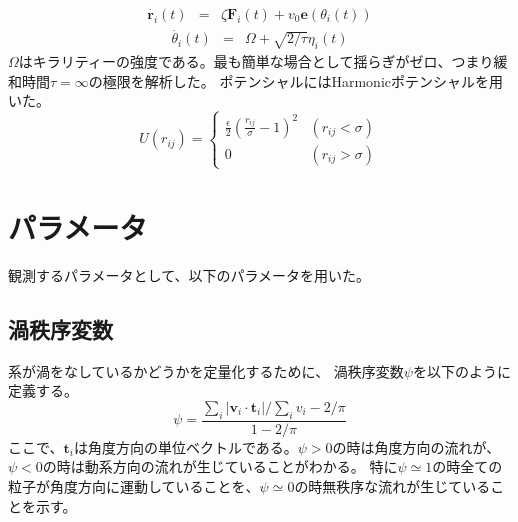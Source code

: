 \documentclass[/Users/ikedahajime/GitHub/reserch/master_report/thesis]{subfiles}
\begin{document}
\begin{eqnarray}
    \dot{\bm{r}_i}(t) &=& \zeta \bm{F}_i(t)+v_0 \bm{e}(\theta_i (t))
\end{eqnarray}
\begin{eqnarray}
    \dot{\theta_i }(t) &=& \Omega+\sqrt{2/\tau}\eta_i(t)
\end{eqnarray}
$\Omega$はキラリティーの強度である。最も簡単な場合として揺らぎがゼロ、つまり緩和時間$\tau=\infty$の極限を解析した。
ポテンシャルにはHarmonicポテンシャルを用いた。
\begin{equation}
    U(r_{ij})=
    \begin{cases}
        \frac{\epsilon}{2}\left(\frac{r_{ij}}{\sigma}-1\right)^2 &(r_{ij}<\sigma)\\
        0 & (r_{ij}>\sigma)

    \end{cases}
\end{equation}

\section{パラメータ}
観測するパラメータとして、以下のパラメータを用いた。
\subsection{渦秩序変数}\label{subsec:vortes_order_parameter}
系が渦をなしているかどうかを定量化するために、
渦秩序変数$\psi$\cite{wiolandConfinementStabilizesBacterial2013}を以下のように定義する。
\begin{equation}
    \psi=\frac{\sum_i \left|\bm{v}_i\cdot \bm{t}_i \right|/\sum_i v_i -2/\pi}{1-2/\pi}
\end{equation}
ここで、$\bm{t}_i$は角度方向の単位ベクトルである。$\psi>0$の時は角度方向の流れが、$\psi<0$の時は動系方向の流れが生じていることがわかる。
特に$\psi\simeq1$の時全ての粒子が角度方向に運動していることを、$\psi\simeq0$の時無秩序な流れが生じていることを示す。
\end{document}
